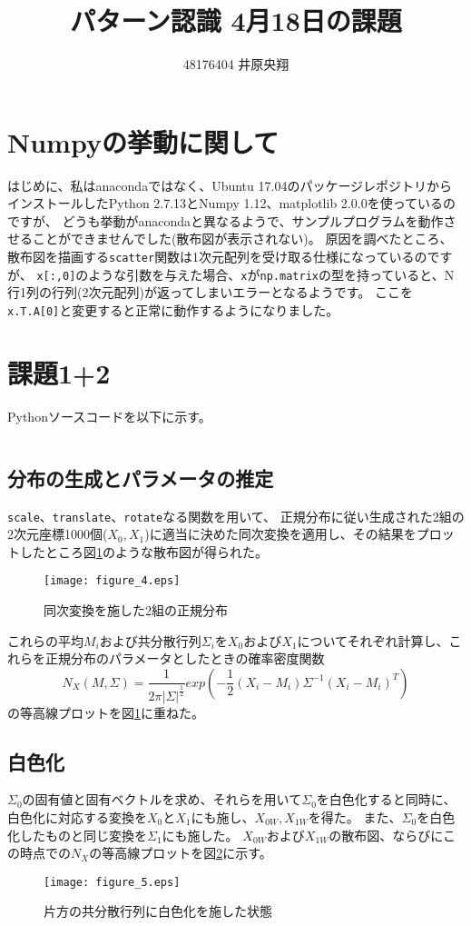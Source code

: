 \documentclass[uplatex,a4paper]{jsarticle}
\title{パターン認識 4月18日の課題}
\author{48176404 井原央翔}
\begin{document}
\maketitle
\section{Numpyの挙動に関して}
はじめに、私はanacondaではなく、Ubuntu 17.04のパッケージレポジトリからインストールしたPython 2.7.13とNumpy 1.12、matplotlib 2.0.0を使っているのですが、
どうも挙動がanacondaと異なるようで、サンプルプログラムを動作させることができませんでした(散布図が表示されない)。
原因を調べたところ、散布図を描画する\texttt{scatter}関数は1次元配列を受け取る仕様になっているのですが、
\texttt{x[:,0]}のような引数を与えた場合、\texttt{x}が\texttt{np.matrix}の型を持っていると、N行1列の行列(2次元配列)が返ってしまいエラーとなるようです。
ここを\texttt{x.T.A[0]}と変更すると正常に動作するようになりました。
\section{課題1+2}
Pythonソースコードを以下に示す。
\inputminted[linenos=true,fontsize=\footnotesize,breaklines=true,bgcolor=bg]{python}{assignment2.py}
\subsection{分布の生成とパラメータの推定}
\texttt{scale}、\texttt{translate}、\texttt{rotate}なる関数を用いて、
正規分布に従い生成された2組の2次元座標1000個($X_0,X_1$)に適当に決めた同次変換を適用し、その結果をプロットしたところ図\ref{fig:scatter0}のような散布図が得られた。
\begin{figure}[htbp]
\begin{center}
\texttt{[image: figure\_4.eps]}
\caption{同次変換を施した2組の正規分布}
\label{fig:scatter0}
\end{center}
\end{figure}
これらの平均$M_i$および共分散行列$\Sigma_i$を$X_0$および$X_1$についてそれぞれ計算し、これらを正規分布のパラメータとしたときの確率密度関数
\[
N_X\left(M,\Sigma\right) = \frac{1}{2\pi \left|\Sigma\right|^\frac{1}{2}} exp\left(-\frac{1}{2}\left(X_i-M_i\right)\Sigma^{-1}\left(X_i-M_i\right)^T\right)
\]
の等高線プロットを図\ref{fig:scatter0}に重ねた。
\subsection{白色化}
$\Sigma_0$の固有値と固有ベクトルを求め、それらを用いて$\Sigma_0$を白色化すると同時に、
白色化に対応する変換を$X_0$と$X_1$にも施し、$X_{0W},X_{1W}$を得た。
また、$\Sigma_0$を白色化したものと同じ変換を$\Sigma_1$にも施した。
$X_{0W}$および$X_{1W}$の散布図、ならびにこの時点での$N_X$の等高線プロットを図\ref{fig:scatter1}に示す。
\begin{figure}[htbp]
\begin{center}
\texttt{[image: figure\_5.eps]}
\caption{片方の共分散行列に白色化を施した状態}
\label{fig:scatter1}
\end{center}
\end{figure}
\end{document}
